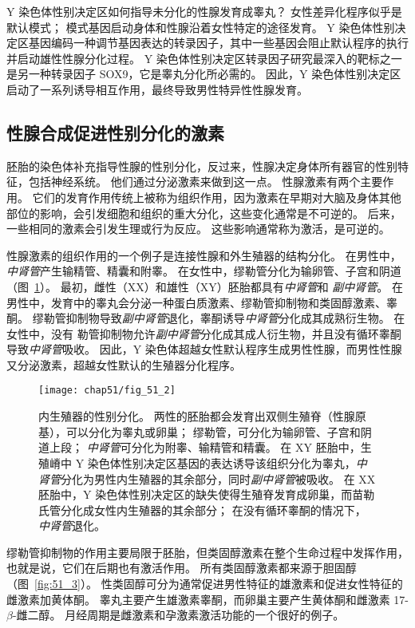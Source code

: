 Y 染色体性别决定区如何指导未分化的性腺发育成睾丸？
女性差异化程序似乎是默认模式；
模式基因启动身体和性腺沿着女性特定的途径发育。
Y 染色体性别决定区基因编码一种调节基因表达的转录因子，其中一些基因会阻止默认程序的执行并启动雄性性腺分化过程。
Y 染色体性别决定区转录因子研究最深入的靶标之一是另一种转录因子 SOX9，它是睾丸分化所必需的。
因此，Y 染色体性别决定区启动了一系列诱导相互作用，最终导致男性特异性性腺发育。



\subsection{性腺合成促进性别分化的激素}

胚胎的染色体补充指导性腺的性别分化，反过来，性腺决定身体所有器官的性别特征，包括神经系统。
他们通过分泌激素来做到这一点。
性腺激素有两个主要作用。
它们的发育作用传统上被称为组织作用，因为激素在早期对大脑及身体其他部位的影响，会引发细胞和组织的重大分化，这些变化通常是不可逆的。
后来，一些相同的激素会引发生理或行为反应。
这些影响通常称为激活，是可逆的。


性腺激素的组织作用的一个例子是连接性腺和外生殖器的结构分化。
在男性中，\textit{中肾管}产生输精管、精囊和附睾。
在女性中，缪勒管分化为输卵管、子宫和阴道（图~\ref{fig:51_2}）。
最初，雌性（XX）和雄性（XY）胚胎都具有\textit{中肾管}和 \textit{副中肾管}。
在男性中，发育中的睾丸会分泌一种蛋白质激素、缪勒管抑制物和类固醇激素、睾酮。
缪勒管抑制物导致\textit{副中肾管}退化，睾酮诱导\textit{中肾管}分化成其成熟衍生物。
在女性中，没有 勒管抑制物允许\textit{副中肾管}分化成其成人衍生物，并且没有循环睾酮导致\textit{中肾管}吸收。
因此，Y 染色体超越女性默认程序生成男性性腺，而男性性腺又分泌激素，超越女性默认的生殖器分化程序。


\begin{figure}[htbp]
	\centering
	\texttt{[image: chap51/fig\_51\_2]}
	\caption{内生殖器的性别分化。
		两性的胚胎都会发育出双侧生殖脊（性腺原基），可以分化为睾丸或卵巢； 缪勒管，可分化为输卵管、子宫和阴道上段；
		\textit{中肾管}可分化为附睾、输精管和精囊。
		在 XY 胚胎中，生殖嵴中 Y 染色体性别决定区基因的表达诱导该组织分化为睾丸，\textit{中肾管}分化为男性内生殖器的其余部分，同时\textit{副中肾管}被吸收。
		在 XX 胚胎中，Y 染色体性别决定区的缺失使得生殖脊发育成卵巢，而苗勒氏管分化成女性内生殖器的其余部分；
		在没有循环睾酮的情况下，\textit{中肾管}退化\cite{wilhelm2007sex}。}
	\label{fig:51_2}
\end{figure}


缪勒管抑制物的作用主要局限于胚胎，但类固醇激素在整个生命过程中发挥作用，也就是说，它们在后期也有激活作用。 
所有类固醇激素都来源于胆固醇（图~\ref{fig:51_3}）。
性类固醇可分为通常促进男性特征的雄激素和促进女性特征的雌激素加黄体酮。
睾丸主要产生雄激素睾酮，而卵巢主要产生黄体酮和雌激素 17-$ \beta $-雌二醇。
月经周期是雌激素和孕激素激活功能的一个很好的例子。


